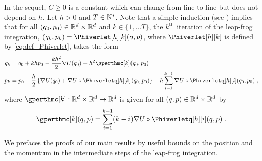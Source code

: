  In the sequel, $C \geq 0$
  is a constant which can change from line to line but does not depend
  on $h$. Let $h >0$ and $T \in \mathbb{N}^*$. Note that a simple induction (see \cite[Proposition 4.2]{livingstone:betancourt:byrne:girolami:2016})  implies that for all $(q_0,p_0) \in \mathbb{R}^d
\times \mathbb{R}^d$ and $k \in \{1,\ldots T\}$, the $k^{\text{th}}$
iteration of the leap-frog integration, $(q_k,p_k) = \Phiverlet[h][k](\q,\p)$, where $\Phiverlet[h][k]$ is defined by \eqref{eq:def_Phiverlet}, takes the form
\begin{align}
\label{eq:qk}
\q_k&=\q_0+kh\p_0-\frac{kh^2}{2} \nabla \F(\q_0)-h^2 \gperthmc[k](\q_0,\p_0)\\
\label{eq:pk}
\p_{k}&= \p_0-\frac{h}{2} \defEns{\nabla \F(\q_0)+\nabla \F \circ \Phiverletq[h][k] (\q_0,\p_0)}-h \sum_{i=1}^{k-1}\nabla \F \circ \Phiverletq[h][i](\q_0,\p_0)  \eqsp,
\end{align}
where  $\gperthmc[k] :\rset^d \times \rset^d \to \rset^d$ is given  for all $(q,p) \in \mathbb{R}^d \times
\mathbb{R}^d$ by
\begin{equation}
  \label{eq:def_gperthmc}
\gperthmc[k](\q,\p) =    \sum_{i=1}^{k-1}(k-i)\nabla \F \circ \Phiverletq[h][i](\q,\p) \eqsp.
\end{equation}

We prefaces the proofs of our main results by useful bounds  on
  the position and the momentum in the intermediate steps of the leap-frog integration.


